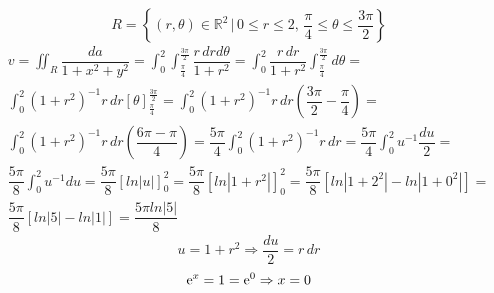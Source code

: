 \begin{enumerate}
	\begin{equation*}
		R = \left\{(r, \theta) \in \mathbb{R}^2 \,|\, 0 \leq r \leq 2,\, \dfrac{\pi}{4} \leq \theta \leq \dfrac{3\pi}{2} \right\}
	\end{equation*}
	\begin{align*}
		v = \iint_R \dfrac{da}{1 + x^2 + y^2} = \int_0^2 \int_{\frac{\pi}{4}}^{\frac{3\pi}{2}} \dfrac{r\, drd\theta}{1 + r^2} = \int_0^2 \dfrac{r\, dr}{1 + r^2} \int_{\frac{\pi}{4}}^{\frac{3\pi}{2}} d\theta =\\ \int_0^2 \left(1 + r^2\right)^{-1} r\, dr \left[\theta\right]_{\frac{\pi}{4}}^{\frac{3\pi}{2}} = \int_0^2 \left(1 + r^2\right)^{-1} r\, dr \left(\dfrac{3\pi}{2} - \dfrac{\pi}{4}\right) =\\ \int_0^2 \left(1 + r^2\right)^{-1} r\, dr\left(\dfrac{6\pi - \pi}{4}\right) = \dfrac{5\pi}{4}\int_0^2 \left(1 + r^2\right)^{-1} r\, dr = \dfrac{5\pi}{4}\int_0^2 u^{-1} \dfrac{du}{2} =\\ \dfrac{5\pi}{8}\int_0^2 u^{-1} du = \dfrac{5\pi}{8}\left[ln |u|\right]_0^2 = \dfrac{5\pi}{8}\left[ln |1 + r^2|\right]_0^2 = \dfrac{5\pi}{8}\left[ln |1 + 2^2| - ln |1 + 0^2|\right] =\\ \dfrac{5\pi}{8}\left[ln |5| - ln |1|\right] = \dfrac{5\pi ln |5|}{8}
	\end{align*}
	\begin{equation*}
		u = 1 + r^2 \Rightarrow \dfrac{du}{2} = r\,dr
	\end{equation*}
	\begin{equation*}
		\operatorname{e}^x = 1 = \operatorname{e}^0 \Rightarrow x = 0
	\end{equation*}
\end{enumerate}
